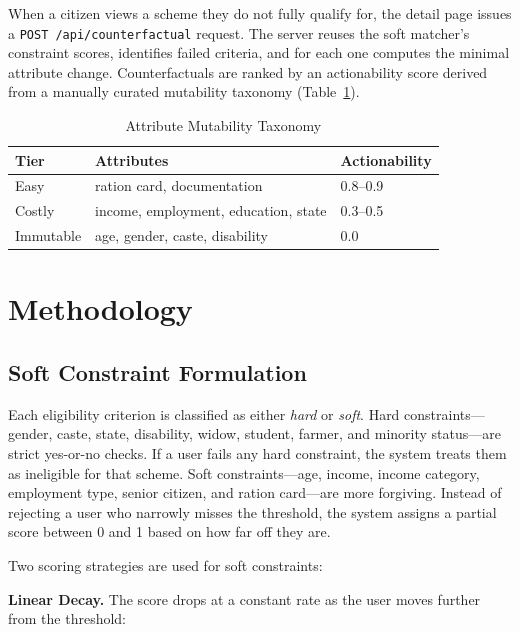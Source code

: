 \documentclass[conference]{IEEEtran}
\begin{document}
When a citizen views a scheme they do not fully qualify for, the detail page issues a \texttt{POST /api/counterfactual} request. The server reuses the soft matcher's constraint scores, identifies failed criteria, and for each one computes the minimal attribute change. Counterfactuals are ranked by an actionability score derived from a manually curated mutability taxonomy (Table~\ref{tab:mutability}).

\begin{table}[t]
\centering
\caption{Attribute Mutability Taxonomy}
\label{tab:mutability}
\begin{tabular}{@{}lll@{}}
\toprule
\textbf{Tier} & \textbf{Attributes} & \textbf{Actionability} \\
\midrule
Easy & ration card, documentation & 0.8--0.9 \\
Costly & income, employment, education, state & 0.3--0.5 \\
Immutable & age, gender, caste, disability & 0.0 \\
\bottomrule
\end{tabular}
\end{table}


\section{Methodology}

\subsection{Soft Constraint Formulation}

Each eligibility criterion is classified as either \textit{hard} or \textit{soft}. Hard constraints---gender, caste, state, disability, widow, student, farmer, and minority status---are strict yes-or-no checks. If a user fails any hard constraint, the system treats them as ineligible for that scheme. Soft constraints---age, income, income category, employment type, senior citizen, and ration card---are more forgiving. Instead of rejecting a user who narrowly misses the threshold, the system assigns a partial score between 0 and 1 based on how far off they are.

Two scoring strategies are used for soft constraints:

\textbf{Linear Decay.} The score drops at a constant rate as the user moves further from the threshold:
\end{document}
